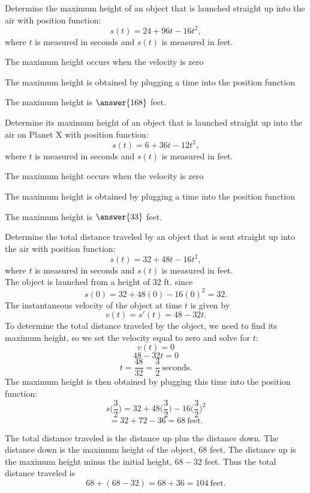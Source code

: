 \documentclass{ximera}
\begin{document}
\begin{problem}
Determine the maximum height
of an object that is launched straight up into the air with position function:
\[s(t) = 24 + 96t - 16t^2,\]
where $t$ is measured in seconds and $s(t)$ is measured in feet. 

\begin{hint}
The maximum height occurs when the velocity is zero
\end{hint}
\begin{hint}
The maximum height is obtained by plugging a time into the position function
\end{hint}

The maximum height is $\answer{168}$ feet.

\end{problem}


\begin{problem}
Determine its maximum height
of an object that is launched straight up into the air on Planet X with position function:
\[s(t) = 6 + 36t - 12t^2,\]
where $t$ is measured in seconds and $s(t)$ is measured in feet. 

\begin{hint}
The maximum height occurs when the velocity is zero
\end{hint}
\begin{hint}
The maximum height is obtained by plugging a time into the position function
\end{hint}

The maximum height is $\answer{33}$ feet.

\end{problem}
 
 
\begin{example}
Determine the total distance traveled by
an object that is sent straight up into the air with position function:
\[s(t) = 32 + 48t - 16t^2,\]
where $t$ is measured in seconds and $s(t)$ is measured in feet. \\
The object is launched from a height of 32 ft. since 
\[s(0) = 32 + 48(0) - 16(0)^2 = 32.\]
The instantaneous velocity of the object at time $t$ is given by
\[v(t) = s'(t) = 48-32t.\]
To determine the total distance traveled by the object, we need to find its maximum height, so
we set the velocity equal to zero and solve for $t$:
\[v(t) = 0  \] 
\[48-32t = 0\]
\[t = \frac{48}{32} = \frac{3}{2} \ \text{seconds}.\]
The maximum height is then obtained by plugging this time into the position function:
\[s\Big(\frac{3}{2}\Big) = 32 + 48\Big(\frac{3}{2}\Big) - 16\Big(\frac{3}{2}\Big)^2 \]
\[= 32 + 72 - 36 = 68 \  \text{feet}. \]

The total distance traveled is the distance up plus the distance down.  The distance down is the maximum height of the object,
$68$ feet.  The distance up is the maximum height minus the initial height, $68 - 32$ feet.
Thus the total distance traveled is  
\[68 + (68 - 32) = 68 + 36 = 104 \ \text{feet}.\]
\end{example}
\end{document}
